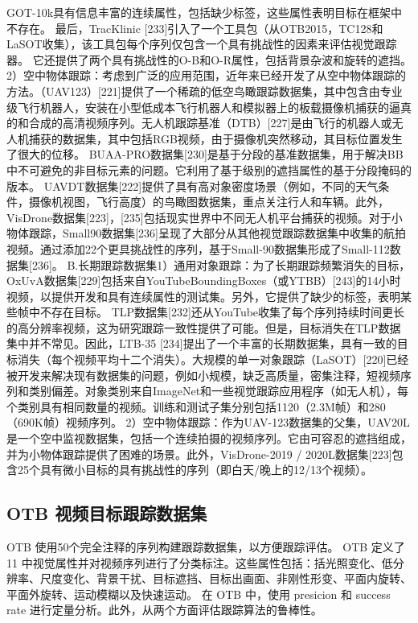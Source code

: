 GOT-10k具有信息丰富的连续属性，包括缺少标签，这些属性表明目标在框架中不存在。 最后，TracKlinic [233]引入了一个工具包（从OTB2015，TC128和LaSOT收集），该工具包每个序列仅包含一个具有挑战性的因素来评估视觉跟踪器。 它还提供了两个具有挑战性的O-B和O-R属性，包括背景杂波和旋转的遮挡。 2）空中物体跟踪：考虑到广泛的应用范围，近年来已经开发了从空中物体跟踪的方法。（UAV123）[221]提供了一个稀疏的低空鸟瞰跟踪数据集，其中包含由专业级飞行机器人，安装在小型低成本飞行机器人和模拟器上的板载摄像机捕获的逼真的和合成的高清视频序列。无人机跟踪基准（DTB）[227]是由飞行的机器人或无人机捕获的数据集，其中包括RGB视频，由于摄像机突然移动，其目标位置发生了很大的位移。 BUAA-PRO数据集[230]是基于分段的基准数据集，用于解决BB中不可避免的非目标元素的问题。它利用了基于级别的遮挡属性的基于分段掩码的版本。 UAVDT数据集[222]提供了具有高对象密度场景（例如，不同的天气条件，摄像机视图，飞行高度）的鸟瞰图数据集，重点关注行人和车辆。此外，VisDrone数据集[223]，[235]包括现实世界中不同无人机平台捕获的视频。对于小物体跟踪，Small90数据集[236]呈现了大部分从其他视觉跟踪数据集中收集的航拍视频。通过添加22个更具挑战性的序列，基于Small-90数据集形成了Small-112数据集[236]。 B.长期跟踪数据集1）通用对象跟踪：为了长期跟踪频繁消失的目标，OxUvA数据集[229]包括来自YouTubeBoundingBoxes（或YTBB）[243]的14小时视频，以提供开发和具有连续属性的测试集。另外，它提供了缺少的标签，表明某些帧中不存在目标。 TLP数据集[232]还从YouTube收集了每个序列持续时间更长的高分辨率视频，这为研究跟踪一致性提供了可能。但是，目标消失在TLP数据集中并不常见。因此，LTB-35 [234]提出了一个丰富的长期数据集，具有一致的目标消失（每个视频平均十二个消失）。大规模的单一对象跟踪（LaSOT）[220]已经被开发来解决现有数据集的问题，例如小规模，缺乏高质量，密集注释，短视频序列和类别偏差。对象类别来自ImageNet和一些视觉跟踪应用程序（如无人机），每个类别具有相同数量的视频。训练和测试子集分别包括1120（2.3M帧）和280（690K帧）视频序列。 2）空中物体跟踪：作为UAV-123数据集的父集，UAV20L是一个空中监视数据集，包括一个连续拍摄的视频序列。它由可容忍的遮挡组成，并为小物体跟踪提供了困难的场景。此外，VisDrone-2019 / 2020L数据集[223]包含25个具有微小目标的具有挑战性的序列（即白天/晚上的12/13个视频）。%

\subsection{OTB 视频目标跟踪数据集}
OTB 使用50个完全注释的序列构建跟踪数据集，以方便跟踪评估。
OTB 定义了 11 中视觉属性并对视频序列进行了分类标注。这些属性包括：括光照变化、低分辨率、尺度变化、背景干扰、目标遮挡、目标出画面、非刚性形变、平面内旋转、平面外旋转、运动模糊以及快速运动。
在 OTB 中，使用 presicion 和 success rate 进行定量分析。此外，从两个方面评估跟踪算法的鲁棒性。

